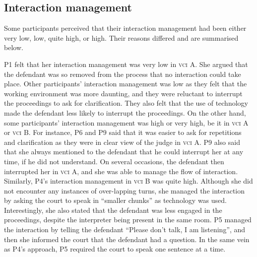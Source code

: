 \documentclass[output=paper]{langsci/langscibook}
\begin{document}
\subsection{Interaction management} 

Some participants perceived that their interaction management had been either very low, low, quite high, or high. Their reasons differed and are summarised below. 

P1 felt that her interaction management was very low in \textsc{vci} A. She argued that the defendant was so removed from the process that no interaction could take place. Other participants’ interaction management was low as they felt that the working environment was more daunting, and they were reluctant to interrupt the proceedings to ask for clarification. They also felt that the use of technology made the defendant less likely to interrupt the proceedings. On the other hand, some participants’ interaction management was high or very high, be it in \textsc{vci} A or \textsc{vci} B. For instance, P6 and P9 said that it was easier to ask for repetitions and clarification as they were in clear view of the judge in \textsc{vci} A. P9 also said that she always mentioned to the defendant that he could interrupt her at any time, if he did not understand. On several occasions, the defendant then interrupted her in \textsc{vci} A, and she was able to manage the flow of interaction. Similarly, P4’s interaction management in \textsc{vci} B was quite high. Although she did not encounter any instances of over-lapping turns, she managed the interaction by asking the court to speak in “smaller chunks” as technology was used. Interestingly, she also stated that the defendant was less engaged in the proceedings, despite the interpreter being present in the same room. P5 managed the interaction by telling the defendant “Please don’t talk, I am listening”, and then she informed the court that the defendant had a question. In the same vein as P4’s approach, P5 required the court to speak one sentence at a time. 
\end{document}
